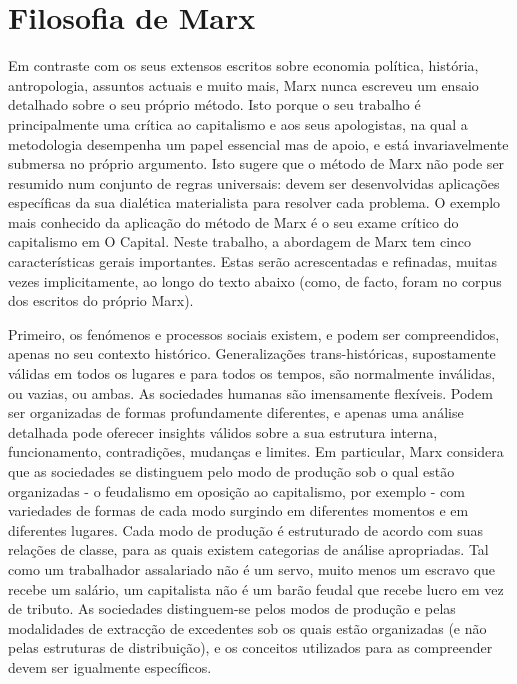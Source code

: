\section{Filosofia de Marx}
 \par 
Em contraste com os seus extensos escritos sobre economia política, história, antropologia, assuntos actuais e muito mais, Marx nunca escreveu um ensaio detalhado sobre o seu próprio método. Isto porque o seu trabalho é principalmente uma crítica ao capitalismo e aos seus apologistas, na qual a metodologia desempenha um papel essencial mas de apoio, e está invariavelmente submersa no próprio argumento. Isto sugere que o método de Marx não pode ser resumido num conjunto de regras universais: devem ser desenvolvidas aplicações específicas da sua dialética materialista para resolver cada problema. O exemplo mais conhecido da aplicação do método de Marx é o seu exame crítico do capitalismo em O Capital. Neste trabalho, a abordagem de Marx tem cinco características gerais importantes. Estas serão acrescentadas e refinadas, muitas vezes implicitamente, ao longo do texto abaixo (como, de facto, foram no corpus dos escritos do próprio Marx).
 \par 
Primeiro, os fenómenos e processos sociais existem, e podem ser compreendidos, apenas no seu contexto histórico. Generalizações trans-históricas, supostamente válidas em todos os lugares e para todos os tempos, são normalmente inválidas, ou vazias, ou ambas. As sociedades humanas são imensamente flexíveis. Podem ser organizadas de formas profundamente diferentes, e apenas uma análise detalhada pode oferecer insights válidos sobre a sua estrutura interna, funcionamento, contradições, mudanças e limites. Em particular, Marx considera que as sociedades se distinguem pelo modo de produção sob o qual estão organizadas - o feudalismo em oposição ao capitalismo, por exemplo - com variedades de formas de cada modo surgindo em diferentes momentos e em diferentes lugares. Cada modo de produção é estruturado de acordo com suas relações de classe, para as quais existem categorias de análise apropriadas. Tal como um trabalhador assalariado não é um servo, muito menos um escravo que recebe um salário, um capitalista não é um barão feudal que recebe lucro em vez de tributo. As sociedades distinguem-se pelos modos de produção e pelas modalidades de extracção de excedentes sob os quais estão organizadas (e não pelas estruturas de distribuição), e os conceitos utilizados para as compreender devem ser igualmente específicos.
 \par 
